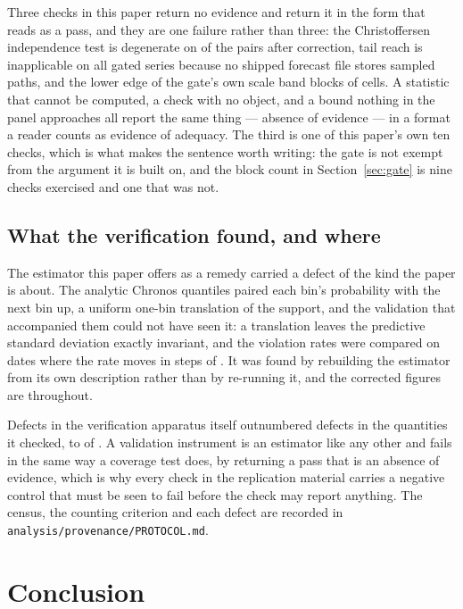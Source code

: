 \documentclass[preprint,11pt,authoryear]{elsarticle}
\newcommand{\1}{\boldsymbol{1}}
\begin{document}
Three checks in this paper return no evidence and return it in the form that
reads as a pass, and they are one failure rather than three: the Christoffersen
independence test is degenerate on \nMainCCUndefined{} of the \nMainPairs{} pairs
after correction, tail reach is inapplicable on all \nGateSeries{} gated series
because no shipped forecast file stores sampled paths, and the lower edge of the
gate's own scale band blocks \nGapCellsLowerBlocks{} of \nGapCellsTotal{} cells.
A statistic that cannot be computed, a check with no object, and a bound nothing
in the panel approaches all report the same thing --- absence of evidence --- in
a format a reader counts as evidence of adequacy. The third is one of this
paper's own ten checks, which is what makes the sentence worth writing: the gate
is not exempt from the argument it is built on, and the block count in
Section~\ref{sec:gate} is nine checks exercised and one that was not.

\subsection{What the verification found, and where}
\label{sec:harness_limits}

The estimator this paper offers as a remedy carried a defect of the kind the
paper is about. The analytic Chronos quantiles paired each bin's probability
with the next bin up, a uniform one-bin translation of the support, and the
validation that accompanied them could not have seen it: a translation leaves
the predictive standard deviation exactly invariant, and the violation rates
were compared on \nLitAnalyticDates{} dates where the rate moves in steps of
\nLitAnalyticGrid. It was found by rebuilding the estimator from its own
description rather than by re-running it, and the corrected figures are
throughout.

Defects in the verification apparatus itself outnumbered defects in the
quantities it checked, \nHarnessDefectsInstrument{} to
\nHarnessDefectsObject{} of \nHarnessDefectsTotal. A validation instrument is
an estimator like any other and fails in the same way a coverage test does, by
returning a pass that is an absence of evidence, which is why every check in
the replication material carries a negative control that must be seen to fail
before the check may report anything. The census, the counting criterion and
each defect are recorded in \texttt{analysis/provenance/PROTOCOL.md}.

\section{Conclusion}
\label{sec:conclude}
\label{sec:practitioner}
\end{document}

